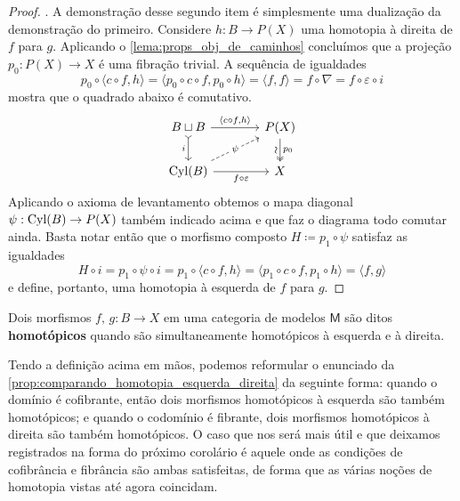 \begin{proof}
  . A demonstração desse segundo item é simplesmente uma dualização da demonstração do primeiro.
  Considere $h: B \to P(X)$ uma homotopia à direita de $f$ para $g$.
  Aplicando o \cref{lema:props_obj_de_caminhos} concluímos que a projeção $p_{0}: P(X) \to X$ é uma fibração trivial.
  A sequência de igualdades
  \begin{displaymath}
    p_{0} \circ \langle c \circ f, h \rangle
    = \langle p_{0} \circ c \circ f, p_{0} \circ h \rangle
    = \langle f,f \rangle
    = f \circ \nabla
    = f \circ \varepsilon \circ i
  \end{displaymath}
  mostra que o quadrado abaixo é comutativo.
  \begin{displaymath}
    \begin{tikzcd}[column sep=1.3cm]
      B \sqcup B
      \arrow[r, "{\langle c \circ f, h \rangle}"]
      \arrow[d, tail, "i" swap]
      & P(X)
      \arrow[d, two heads, "p_{0}", "\sim" {swap, sloped}]
      \\ \Cyl(B)
      \arrow[ru,dashed, "\psi" description]
      \arrow[r, "f \circ \varepsilon" swap]
      & X
    \end{tikzcd}
  \end{displaymath}
  Aplicando o axioma de levantamento obtemos o mapa diagonal $\psi: \mathrm{Cyl}(B) \to P(X)$ também indicado acima e que faz o diagrama todo comutar ainda.
  Basta notar então que o morfismo composto $H \coloneqq p_{1} \circ \psi$ satisfaz as igualdades
  \begin{displaymath}
    H \circ i = p_{1} \circ \psi \circ i = p_{1} \circ \langle c \circ f,h \rangle = \langle p_{1} \circ c \circ f, p_{1} \circ h \rangle = \langle f,g \rangle
  \end{displaymath}
  e define, portanto, uma homotopia à esquerda de $f$ para $g$.
\end{proof}

\begin{defin}\label{defin:homotopia}
  Dois morfismos $f,\,g: B \to X$ em uma categoria de modelos $\mathsf{M}$ são ditos \textbf{homotópicos} quando são simultaneamente homotópicos à esquerda e à direita.
\end{defin}

Tendo a definição acima em mãos, podemos reformular o enunciado da \cref{prop:comparando_homotopia_esquerda_direita} da seguinte forma: quando o domínio é cofibrante, então dois morfismos homotópicos à esquerda são também homotópicos; e quando o codomínio é fibrante, dois morfismos homotópicos à direita são também homotópicos.
O caso que nos será mais útil e que deixamos registrados na forma do próximo corolário é aquele onde as condições de cofibrância e fibrância são ambas satisfeitas, de forma que as várias noções de homotopia vistas até agora coincidam.

